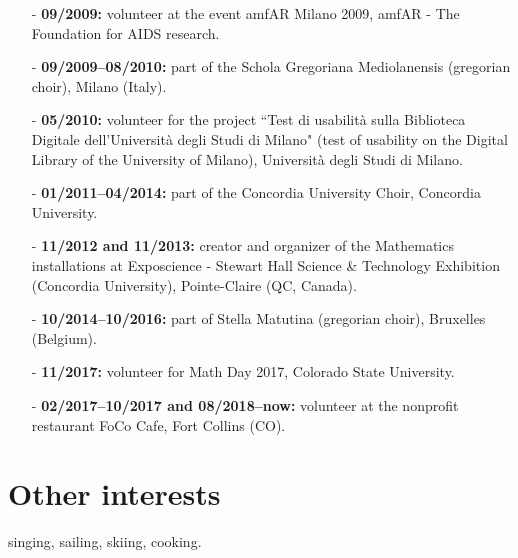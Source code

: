 \documentclass[margin]{res}
\begin{document}
\begin{resume}
\begin{itemize}\itemsep -2pt
\item[-]  {\bf 09/2009:} volunteer at the event amfAR Milano 2009, amfAR - The Foundation for AIDS research.
\item[-] {\bf 09/2009--08/2010:} part of the Schola Gregoriana Mediolanensis (gregorian choir), Milano (Italy).
\item[-]  {\bf 05/2010:} volunteer for the project ``Test di usabilit\`a sulla Biblioteca Digitale dell'Universit\`a degli Studi di Milano" (test of usability on the Digital Library of the University of Milano), Universit\`a degli Studi di Milano.
\item[-] {\bf 01/2011--04/2014:} part of the Concordia University Choir, Concordia University.
\item[-]  {\bf 11/2012 and 11/2013:} creator and organizer of the Mathematics installations at Exposcience - Stewart Hall Science \& Technology Exhibition (Concordia University), Pointe-Claire (QC, Canada).
\item[-] {\bf 10/2014--10/2016:} part of Stella Matutina (gregorian choir), Bruxelles (Belgium).
\item[-] {\bf 11/2017:} volunteer for Math Day 2017, Colorado State University.
\item[-] {\bf 02/2017--10/2017 and 08/2018--now:} volunteer at the nonprofit restaurant FoCo Cafe, Fort Collins (CO).
\end{itemize}

 \section{Other interests}
 
singing, sailing, skiing, cooking.


 
 

\end{resume} 
\end{document}
